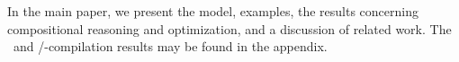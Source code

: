 






In the main paper, we present the model, examples, the results concerning
compositional reasoning and optimization, and a discussion of
related work.  The \drfsc\ and \armeight/\tso-compilation results may be found in the appendix.



